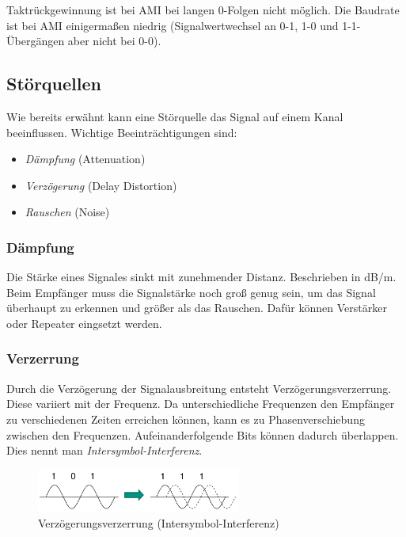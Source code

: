 \documentclass[a4paper, 14pt]{article}
\begin{document}
	Taktrückgewinnung ist bei AMI bei langen 0-Folgen nicht möglich.
	Die Baudrate ist bei AMI einigermaßen niedrig (Signalwertwechsel an 0-1, 1-0 und 1-1-Übergängen aber nicht bei 0-0).

	\subsection{Störquellen}

	Wie bereits erwähnt kann eine Störquelle das Signal auf einem Kanal beeinflussen.
	Wichtige Beeinträchtigungen sind:

	\begin{itemize}
		\item \emph{Dämpfung} (Attenuation)
		\item \emph{Verzögerung} (Delay Distortion)
		\item \emph{Rauschen} (Noise)
	\end{itemize}

	\subsubsection{Dämpfung}

	Die Stärke eines Signales sinkt mit zunehmender Distanz.
	Beschrieben in dB/m.
	Beim Empfänger muss die Signalstärke noch groß genug sein, um das Signal überhaupt zu erkennen und größer als das Rauschen.
	Dafür können Verstärker oder Repeater eingsetzt werden.

	\subsubsection{Verzerrung}

	Durch die Verzögerung der Signalausbreitung entsteht Verzögerungsverzerrung.
	Diese variiert mit der Frequenz.
	Da unterschiedliche Frequenzen den Empfänger zu verschiedenen Zeiten erreichen können, kann es zu Phasenverschiebung zwischen den Frequenzen.
	Aufeinanderfolgende Bits können dadurch überlappen.
	Dies nennt man \emph{Intersymbol-Interferenz}.

	\begin{figure}
		\begin{center}
			\includegraphics[width=0.6\textwidth]{images/03-intersymbol-interference.png}
		\end{center}
		\caption{Verzögerungsverzerrung (Intersymbol-Interferenz)}
	\end{figure}
\end{document}
